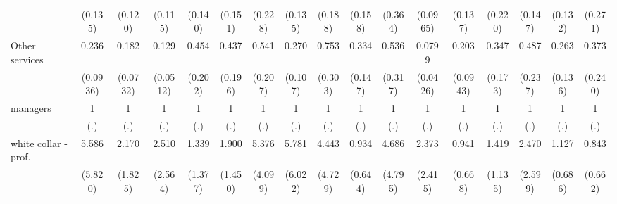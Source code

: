 {\begin{tabular}{l*{16}{c}}
                    &     (0.135)         &     (0.120)         &     (0.115)         &     (0.140)         &     (0.151)         &     (0.228)         &     (0.135)         &     (0.188)         &     (0.158)         &     (0.364)         &    (0.0965)         &     (0.137)         &     (0.220)         &     (0.147)         &     (0.132)         &     (0.271)         \\
[1em]
Other services      &       0.236\sym{***}&       0.182\sym{***}&       0.129\sym{***}&       0.454         &       0.437         &       0.541         &       0.270\sym{***}&       0.753         &       0.334\sym{*}  &       0.536         &      0.0799\sym{***}&       0.203\sym{***}&       0.347\sym{*}  &       0.487         &       0.263\sym{**} &       0.373         \\
                    &    (0.0936)         &    (0.0732)         &    (0.0512)         &     (0.202)         &     (0.196)         &     (0.207)         &     (0.107)         &     (0.303)         &     (0.147)         &     (0.317)         &    (0.0426)         &    (0.0943)         &     (0.173)         &     (0.237)         &     (0.136)         &     (0.240)         \\
[1em]
managers            &           1         &           1         &           1         &           1         &           1         &           1         &           1         &           1         &           1         &           1         &           1         &           1         &           1         &           1         &           1         &           1         \\
                    &         (.)         &         (.)         &         (.)         &         (.)         &         (.)         &         (.)         &         (.)         &         (.)         &         (.)         &         (.)         &         (.)         &         (.)         &         (.)         &         (.)         &         (.)         &         (.)         \\
[1em]
white collar - prof.&       5.586         &       2.170         &       2.510         &       1.339         &       1.900         &       5.376\sym{*}  &       5.781         &       4.443         &       0.934         &       4.686         &       2.373         &       0.941         &       1.419         &       2.470         &       1.127         &       0.843         \\
                    &     (5.820)         &     (1.825)         &     (2.564)         &     (1.377)         &     (1.450)         &     (4.099)         &     (6.022)         &     (4.729)         &     (0.644)         &     (4.795)         &     (2.415)         &     (0.668)         &     (1.135)         &     (2.599)         &     (0.686)         &     (0.662)         \\

\end{tabular}}
